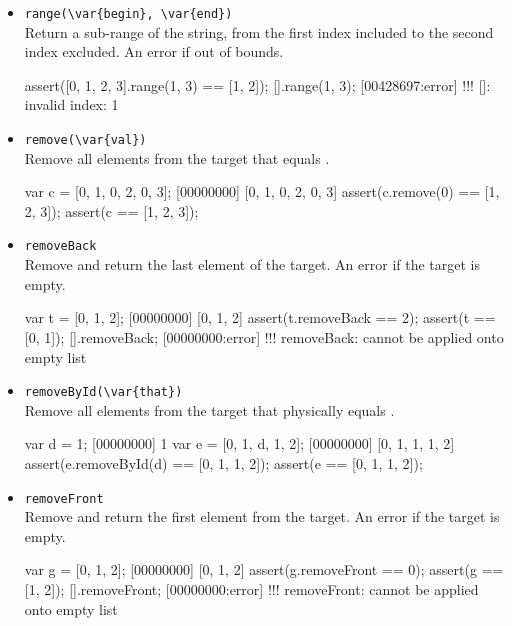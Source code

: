 \begin{itemize}
\item \lstinline|range(\var{begin}, \var{end})|\\
  Return a sub-range of the string, from the first index included to
  the second index excluded. An error if out of bounds.

\begin{urbiscript}[firstnumber=last]
assert([0, 1, 2, 3].range(1, 3) == [1, 2]);
[].range(1, 3);
[00428697:error] !!! []: invalid index: 1
\end{urbiscript}

\item \lstinline|remove(\var{val})|\\
  Remove all elements from the target that equals .

\begin{urbiscript}[firstnumber=last]
var c = [0, 1, 0, 2, 0, 3];
[00000000] [0, 1, 0, 2, 0, 3]
assert(c.remove(0) == [1, 2, 3]);
assert(c == [1, 2, 3]);
\end{urbiscript}

\item \lstinline|removeBack|\\
  Remove and return the last element of the target. An error if the
  target is empty.

\begin{urbiscript}[firstnumber=last]
var t = [0, 1, 2];
[00000000] [0, 1, 2]
assert(t.removeBack == 2);
assert(t == [0, 1]);
[].removeBack;
[00000000:error] !!! removeBack: cannot be applied onto empty list
\end{urbiscript}

\item \lstinline|removeById(\var{that})|\\
  Remove all elements from the target that physically equals
  .

\begin{urbiscript}[firstnumber=last]
var d = 1;
[00000000] 1
var e = [0, 1, d, 1, 2];
[00000000] [0, 1, 1, 1, 2]
assert(e.removeById(d) == [0, 1, 1, 2]);
assert(e == [0, 1, 1, 2]);
\end{urbiscript}

\item \lstinline|removeFront|\\
Remove and return the first element from the target. An error if the
target is empty.

\begin{urbiscript}[firstnumber=last]
var g = [0, 1, 2];
[00000000] [0, 1, 2]
assert(g.removeFront == 0);
assert(g == [1, 2]);
[].removeFront;
[00000000:error] !!! removeFront: cannot be applied onto empty list
\end{urbiscript}


\end{itemize}
